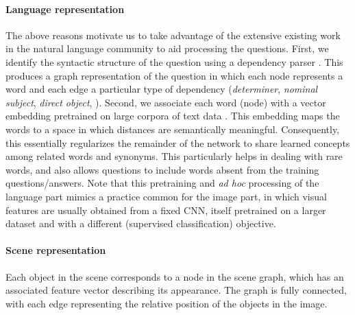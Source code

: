 \paragraph{Language representation}
The above reasons motivate us to take advantage of the extensive existing work in the natural language community to aid processing the questions. First, we identify the syntactic structure of the question using a dependency parser \cite{demarneffe2008parser}. This produces a graph representation of the question in which each node represents a word and each edge a particular type of dependency (\eg \textit{determiner}, \textit{nominal subject}, \textit{direct object}, \etc). Second, we associate each word (node) with a vector embedding pretrained on large corpora of text data \cite{pennington2014glove}. This embedding maps the words to a space in which distances are semantically meaningful. Consequently, this essentially regularizes the remainder of the network to share learned concepts among related words and synonyms. This particularly helps in dealing with rare words, and also allows questions to include words absent from the training questions/answers. Note that this pretraining and \textit{ad hoc} processing of the language part mimics a practice common for the image part, in which visual features are usually obtained from a fixed CNN, itself pretrained on a larger dataset and with a different (supervised classification) objective.

\paragraph{Scene representation}
Each object in the scene corresponds to a node in the scene graph, which has an associated feature vector describing its appearance. The graph is fully connected, with each edge representing the relative position of the objects in the image. 

